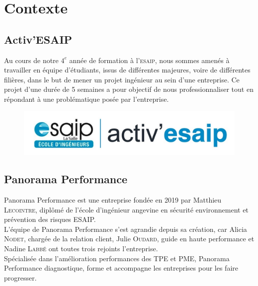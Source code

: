 \setcounter{page}{1}
\section{Contexte}

\subsection{Activ'ESAIP}

Au cours de notre $4^{e}$ année de formation à l'\textsc{esaip}, nous sommes amenés à travailler en équipe d'étudiants, issus de différentes majeures, voire de différentes filières, dans le but de mener un projet ingénieur au sein d'une entreprise. Ce projet d'une durée de 5 semaines a pour objectif de nous professionnaliser tout en répondant à une problématique posée par l'entreprise.


\begin{figure}[!h]
    \centering
    \includegraphics[scale=0.3]{img/activesaip.jpeg}
\end{figure}

\subsection{Panorama Performance}

Panorama Performance est une entreprise fondée en 2019 par Matthieu \textsc{Lecointre}, diplômé de l'école d'ingénieur angevine en sécurité environnement et prévention des risques ESAIP.\\
L'équipe de Panorama Performance s'est agrandie depuis sa création, car Alicia \textsc{Nodet}, chargée de la relation client, Julie \textsc{Oudard}, guide en haute performance et Nadine \textsc{Labbé} ont toutes trois rejoints l'entreprise.\\

Spécialisée dans l'amélioration performances des TPE et PME, Panorama Performance diagnostique, forme et accompagne les entreprises pour les faire progresser.\\

